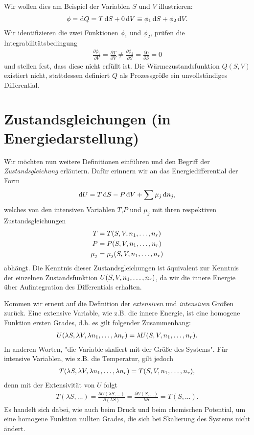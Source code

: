 Wir wollen dies am Beispiel der Variablen $S$ und $V$ illustrieren:
\begin{align*}
    \phi = \udiff Q = T\diff S+0 \diff V\equiv \phi_1\diff S+\phi_2 \diff V.
\end{align*}
Wir identifizieren die zwei Funktionen $\phi_1$ und $\phi_2$, prüfen die Integrabilitätsbedingung
\begin{align*}
    \frac{\partial \phi_1}{\partial V} = \frac{\partial T}{\partial V}\neq \frac{\partial \phi_2}{\partial S}=\frac{\partial0}{\partial S}=0
\end{align*}
und stellen fest, dass diese nicht erfüllt ist. Die Wärmezustandsfunktion $Q(S,V)$ existiert nicht, stattdessen definiert $Q$ als Prozessgröße ein unvollständiges Differential.

\section{Zustandsgleichungen (in Energiedarstellung)}
Wir möchten nun weitere Definitionen einführen und den Begriff der \emph{Zustandsgleichung} erläutern. Dafür erinnern wir an das Energiedifferential der Form
\begin{align*}
    \mathop{}\!\mathrm{d} U = T\mathop{}\!\mathrm{d} S -P\mathop{}\!\mathrm{d} V + \sum\mu_j\mathop{}\!\mathrm{d} n_j,
\end{align*}
welches von den intensiven Variablen $T$,$P$ und $\mu_j$ mit ihren respektiven Zustandsgleichungen
\begin{align*}
    T     & =T(S,V,n_1,\ldots,n_r)     \\
    P     & =P(S,V,n_1,\ldots,n_r)     \\
    \mu_j & =\mu_j(S,V,n_1,\ldots,n_r)
\end{align*}
abhängt. Die Kenntnis dieser Zustandsgleichungen ist äquivalent zur Kenntnis der einzelnen Zustandsfunktion $U(S,V,n_1,\ldots,n_r)$, da wir die innere Energie über Aufintegration des Differentials erhalten.

Kommen wir erneut auf die Definition der \emph{extensiven} und \emph{intensiven} Größen zurück. Eine extensive Variable, wie z.B. die innere Energie, ist eine homogene Funktion ersten Grades, d.h. es gilt folgender Zusammenhang:
\begin{align*}
    U(\lambda S,\lambda V,\lambda n_1,\ldots,\lambda n_r) = \lambda U(S,V,n_1,\ldots,n_r).
\end{align*}
In anderen Worten, "die Variable skaliert mit der Größe des Systems".
Für intensive Variablen, wie z.B. die Temperatur, gilt jedoch
\begin{align*}
    T(\lambda S,\lambda V,\lambda n_1,\ldots,\lambda n_r)=T(S,V,n_1,\ldots,n_r),
\end{align*}
denn mit der Extensivität von $U$ folgt
\begin{align*}
    T(\lambda S,\ldots) = \frac{\partial U(\lambda S,\ldots)}{\partial(\lambda S)}=\frac{\partial U(S,\ldots)}{\partial S}=T(S,\ldots).
\end{align*}
Es handelt sich dabei, wie auch beim Druck und beim chemischen Potential, um eine homogene Funktion nullten Grades, die sich bei Skalierung des Systems nicht ändert.

